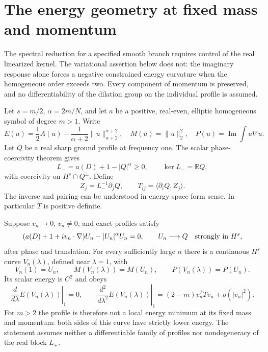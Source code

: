 \section{The energy geometry at fixed mass and momentum}
\label{sec:r12-constraint}

The spectral reduction for a specified smooth branch requires control of
the real linearized kernel. The variational assertion below does not:
the imaginary response alone forces a negative constrained energy
curvature when the homogeneous order exceeds two. Every component of
momentum is preserved, and no differentiability of the dilation group on
the individual profile is assumed.

Let $s=m/2$, $\alpha=2m/N$, and let $a$ be a positive, real-even,
elliptic homogeneous symbol of degree $m>1$. Write
\[
 E(u)=\frac12 A(u)-\frac1{\alpha+2}\|u\|_{\alpha+2}^{\alpha+2},
 \quad M(u)=\|u\|_2^2,
 \quad P(u)=\operatorname{Im}\int\overline u\nabla u.
\]
Let $Q$ be a real sharp ground profile at frequency one. The scalar
phase-coercivity theorem gives
\[
 L_-=a(D)+1-|Q|^\alpha\geq0,\qquad \ker L_-=\mathbb RQ,
\]
with coercivity on $H^s\cap Q^\perp$. Define
\begin{equation}\label{eq:r12-phase-T}
 Z_j=L_-^{-1}\partial_jQ,\qquad
 T_{ij}=\langle\partial_iQ,Z_j\rangle.
\end{equation}
The inverse and pairing can be understood in energy-space form sense.
In particular $T$ is positive definite.

\begin{theorem}
\label{thm:r12-constrained-curvature}
Suppose $v_n\to0$, $v_n\ne0$, and exact profiles satisfy
\[
 (a(D)+1+iv_n\cdot\nabla)U_n-|U_n|^\alpha U_n=0,
 \qquad U_n\longrightarrow Q\quad\hbox{strongly in }H^s,
\]
after phase and translation. For every sufficiently large $n$ there is
a continuous $H^s$ curve $V_n(\lambda)$, defined near $\lambda=1$, with
\[
 V_n(1)=U_n,\qquad
 M(V_n(\lambda))=M(U_n),\qquad
 P(V_n(\lambda))=P(U_n).
\]
Its scalar energy is $C^2$ and obeys
\begin{equation}\label{eq:r12-constrained-curvature}
 \left.\frac{d}{d\lambda}E(V_n(\lambda))\right|_1=0,
 \qquad
 \left.\frac{d^2}{d\lambda^2}E(V_n(\lambda))\right|_1
 =(2-m)v_n^TTv_n+o(|v_n|^2).
\end{equation}
For $m>2$ the profile is therefore not a local energy minimum at its
fixed mass and momentum: both sides of this curve have strictly lower
energy. The statement assumes neither a differentiable family of
profiles nor nondegeneracy of the real block $L_+$.
\end{theorem}

